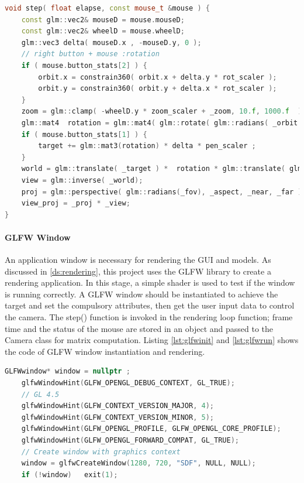 \begin{lstlisting}[language=C++, label={lst:camerastep}, caption = Function of matrix transformation]
    void step( float elapse, const mouse_t &mouse ) {
    const glm::vec2& mouseD = mouse.mouseD;
    const glm::vec2& wheelD = mouse.wheelD;
    glm::vec3 delta( mouseD.x , -mouseD.y, 0 );
    // right button + mouse :rotation
    if ( mouse.button_stats[2] ) {
        orbit.x = constrain360( orbit.x + delta.y * rot_scaler );
        orbit.y = constrain360( orbit.y + delta.x * rot_scaler );
    }
    zoom = glm::clamp( -wheelD.y * zoom_scaler + _zoom, 10.f, 1000.f  );
    glm::mat4  rotation = glm::mat4( glm::rotate( glm::radians( _orbit.y ), Y ) ) * glm::mat4( glm::rotate( glm::radians( _orbit.x ), X ) )  ;
    if ( mouse.button_stats[1] ) {
        target += glm::mat3(rotation) * delta * pen_scaler ;
    }
    world = glm::translate( _target ) *  rotation * glm::translate( glm::vec3(0.f,0.f, _zoom) ) ; 
    view = glm::inverse( _world);
    proj = glm::perspective( glm::radians(_fov), _aspect, _near, _far );
    view_proj = _proj * _view;
}
\end{lstlisting}

\paragraph{GLFW Window}

An application window is necessary for rendering the GUI and models. As discussed in \ref{ds:rendering}, this project uses the GLFW library to create a rendering application. In this stage, a simple shader is used to test if the window is running correctly. A GLFW window should be instantiated to achieve the target and set the compulsory attributes, then get the user input data to control the camera. The step() function is invoked in the rendering loop function; frame time and the status of the mouse are stored in an object and passed to the Camera class for matrix computation. Listing \ref{lst:glfwinit} and \ref{lst:glfwrun} shows the code of GLFW window instantiation and rendering.

\begin{lstlisting}[language=C++, label={lst:glfwinit}, caption = GLFW window instantiation]
    GLFWwindow* window = nullptr ;
    glfwWindowHint(GLFW_OPENGL_DEBUG_CONTEXT, GL_TRUE); 
    // GL 4.5 
    glfwWindowHint(GLFW_CONTEXT_VERSION_MAJOR, 4);
    glfwWindowHint(GLFW_CONTEXT_VERSION_MINOR, 5);
    glfwWindowHint(GLFW_OPENGL_PROFILE, GLFW_OPENGL_CORE_PROFILE);
    glfwWindowHint(GLFW_OPENGL_FORWARD_COMPAT, GL_TRUE);
    // Create window with graphics context
    window = glfwCreateWindow(1280, 720, "SDF", NULL, NULL);
    if (!window)   exit(1);
\end{lstlisting}

